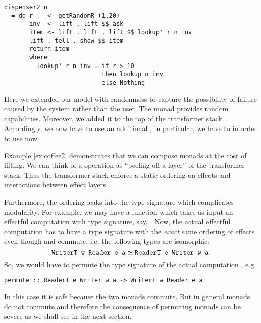\begin{example}
\begin{lstlisting}[style={haskell}]
dispenser2 n 
  = do r    <- getRandomR (1,20)
       inv  <- lift . lift $$ ask
       item <- lift . lift . lift $$ lookup' r n inv
       lift . tell . show $$ item
       return item
       where     
         lookup' r n inv = if r > 10 
                           then lookup n inv 
                           else Nothing
\end{lstlisting}
Here we extended our model with randomness to capture the possiblilty of failure caused by the system rather than the user. The  monad provides random capabilities. Moreover, we added it to the top of the transformer stack. Accordingly, we now have to use an additional , in particular, we have to  in order to use  now.
\end{example}
Example \ref{ex:coffee2} demonstrates that we can compose monads at the cost of lifting. We can think of a  operation as ``peeling off a layer'' of the transformer stack. Thus the transformer stack enforce a static ordering on effects and interactions between effect layers \cite{Kiselyov2013}.

Furthermore, the ordering leaks into the type signature which complicates modularity. For example, we may have a function which takes as input an effectful computation with type signature, say, .
Now, the actual effectful computation has to have a type signature with the \emph{exact} same ordering of effects even though  and  commute, i.e. the following types are isomorphic:
\[ \texttt{WriterT w Reader e a} \simeq \texttt{ReaderT e Writer w a}. \]
So, we would have to permute the type signature of the actual computation \cite{Brady2013}, e.g.
\begin{lstlisting}[style=haskell]
permute :: ReaderT e Writer w a -> WriterT w Reader e a
\end{lstlisting}
In this case it is safe because the two monads commute. But in general monads do not commute and therefore the consequence of permuting monads can be severe as we shall see in the next section.

